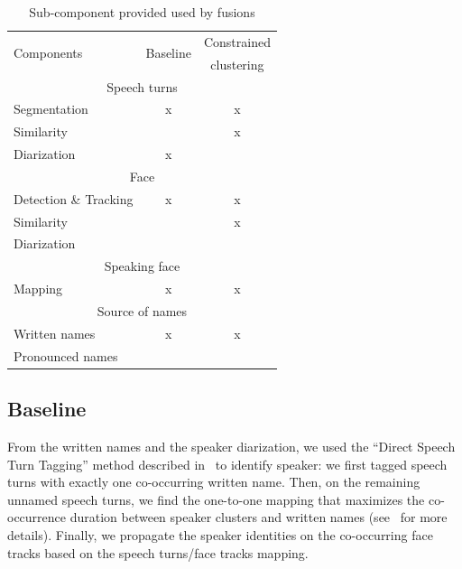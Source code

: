 \documentclass{acm_proc_article-me}
\begin{document}
\begin{table}[ht]
  \centering
  \begin{tabular}{|l|c|c|}
    \hline
	\multirow{2}{*}{Components}	& \multirow{2}{*}{Baseline}	& Constrained 		\\
									&							& clustering 		\\
	\hline
	\hline
	\multicolumn{3}{|c|}{Speech turns}												\\
	\hline
	Segmentation						&			x				&		x			\\
	Similarity						&							&		x			\\
	Diarization						&			x				&					\\
	\hline
	\multicolumn{3}{|c|}{Face}														\\
	\hline
	Detection \& Tracking			&			x				&		x			\\
	Similarity						&							&		x			\\
	Diarization						&							&					\\
	\hline
	\multicolumn{3}{|c|}{Speaking face}												\\
	\hline
	Mapping							&			x				&		x			\\
	\hline
	\multicolumn{3}{|c|}{Source of names}											\\
	\hline
	Written names~\cite{POIGNANT--ICME--2012}	&		x		&		x			\\
	Pronounced names~\cite{LAMEL--IWSLT--2011, DIANRELLI--IJCNLP--2011}	&	&		\\
	\hline
  \end{tabular}
  \caption{Sub-component provided used by fusions}
  \label{tab:subcomp}
\end{table}


\subsection{Baseline}

From the written names and the speaker diarization, we used the ``Direct Speech Turn Tagging'' method described in~\cite{POIGNANT--INTERSPEECH--2012} to identify speaker: we first tagged speech turns with exactly one co-occurring written name. Then, on the remaining unnamed speech turns, we find the one-to-one mapping that maximizes the co-occurrence duration between speaker clusters and written names (see~\cite{POIGNANT--INTERSPEECH--2012} for more details). Finally, we propagate the speaker identities on the co-occurring face tracks based on the speech turns/face tracks mapping.
\end{document}
